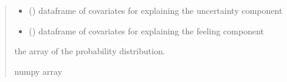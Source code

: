 \documentclass[letterpaper,10pt,english]{sphinxmanual}
\begin{document}
\begin{fulllineitems}
\begin{quote}
\begin{description}
\begin{itemize}
\item {} 
\sphinxAtStartPar
{} () \textendash{} dataframe of covariates for explaining the uncertainty component

\item {} 
\sphinxAtStartPar
{} () \textendash{} dataframe of covariates for explaining the feeling component

\end{itemize}

\sphinxAtStartPar
the array of the probability distribution.

\sphinxAtStartPar
numpy array

\end{description}\end{quote}

\end{fulllineitems}

\end{document}
